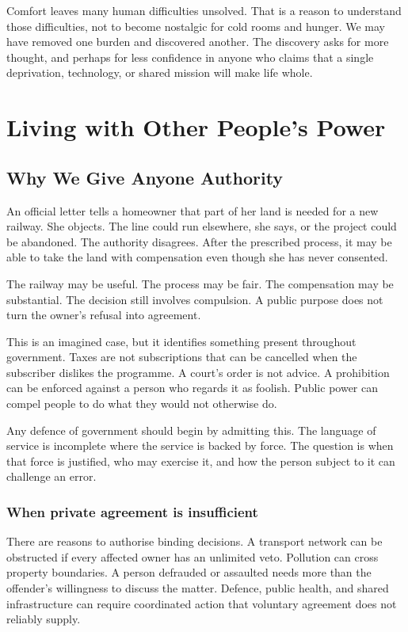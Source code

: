 \documentclass[12pt,a4paper]{book}
\begin{document}
Comfort leaves many human difficulties unsolved. That is a reason to understand those difficulties, not to become nostalgic for cold rooms and hunger. We may have removed one burden and discovered another. The discovery asks for more thought, and perhaps for less confidence in anyone who claims that a single deprivation, technology, or shared mission will make life whole.

\part{Living with Other People's Power}

\chapter{Why We Give Anyone Authority}

An official letter tells a homeowner that part of her land is needed for a new railway. She objects. The line could run elsewhere, she says, or the project could be abandoned. The authority disagrees. After the prescribed process, it may be able to take the land with compensation even though she has never consented.

The railway may be useful. The process may be fair. The compensation may be substantial. The decision still involves compulsion. A public purpose does not turn the owner's refusal into agreement.

This is an imagined case, but it identifies something present throughout government. Taxes are not subscriptions that can be cancelled when the subscriber dislikes the programme. A court's order is not advice. A prohibition can be enforced against a person who regards it as foolish. Public power can compel people to do what they would not otherwise do.

Any defence of government should begin by admitting this. The language of service is incomplete where the service is backed by force. The question is when that force is justified, who may exercise it, and how the person subject to it can challenge an error.

\section*{When private agreement is insufficient}

There are reasons to authorise binding decisions. A transport network can be obstructed if every affected owner has an unlimited veto. Pollution can cross property boundaries. A person defrauded or assaulted needs more than the offender's willingness to discuss the matter. Defence, public health, and shared infrastructure can require coordinated action that voluntary agreement does not reliably supply.
\end{document}
